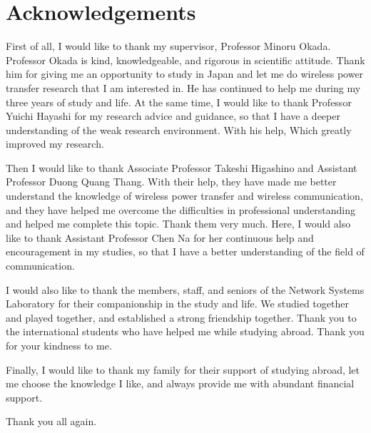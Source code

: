 \chapter*{Acknowledgements}

First of all, I would like to thank my supervisor, Professor Minoru Okada. Professor Okada is kind, knowledgeable, and rigorous in scientific attitude. Thank him for giving me an opportunity to study in Japan and let me do wireless power transfer research that I am interested in. He has continued to help me during my three years of study and life. At the same time, I would like to thank Professor Yuichi Hayashi for my research advice and guidance, so that I have a deeper understanding of the weak research environment. With his help, Which greatly improved my research.

Then I would like to thank Associate Professor Takeshi Higashino and Assistant Professor Duong Quang Thang. With their help, they have made me better understand the knowledge of wireless power transfer and wireless communication, and they have helped me overcome the difficulties in professional understanding and helped me complete this topic. Thank them very much. Here, I would also like to thank Assistant Professor Chen Na for her continuous help and encouragement in my studies, so that I have a better understanding of the field of communication.

I would also like to thank the members, staff, and seniors of the Network Systems Laboratory for their companionship in the study and life. We studied together and played together, and established a strong friendship together. Thank you to the international students who have helped me while studying abroad. Thank you for your kindness to me.

Finally, I would like to thank my family for their support of studying abroad, let me choose the knowledge I like, and always provide me with abundant financial support.

Thank you all again.
